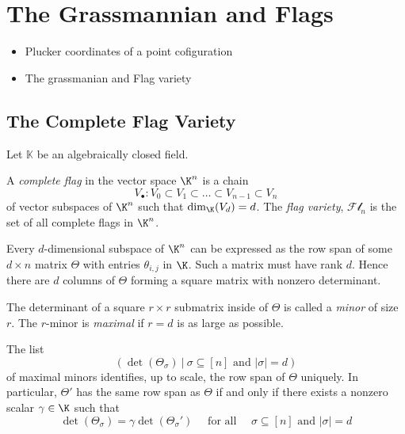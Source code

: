 \section{The Grassmannian and Flags}

\begin{itemize}
    \item Plucker coordinates of a point cofiguration
    \item The grassmanian and Flag variety
\end{itemize}

\subsection{The Complete Flag Variety}

Let $\mathbb{K}$ be an algebraically closed field.

\begin{definition}
    A \textit{complete flag} in the vector space $\K^n$ is a chain
    $$V_{\bullet} : V_{0} \subset V_1 \subset \dots \subset V_{n-1} \subset V_{n} $$
    of vector subspaces of $\K^n$ such that $\text{dim}_{\K}(V_d) = d$.
    The \textit{flag variety}, $\mathcal{Fl}_n$ is the set of all complete flags in $\K^n$.
\end{definition}

Every $d$-dimensional subspace of $\K^n$ can be expressed as the row span of some $d \times n$ matrix $\Theta$ with entries $\theta_{i,j}$ in $\K$.
Such a matrix must have rank $d$.
Hence there are $d$ columns of $\Theta$ forming a square matrix with nonzero determinant.

\begin{definition}[Minor]
    The determinant of a square $r \times r$ submatrix inside of $\Theta$ is called a \textit{minor} of size $r$.
    The $r$-minor is \textit{maximal} if $r = d$ is as large as possible.
\end{definition}

\begin{proposition}
    The list
    $$(\det (\Theta_{\sigma}) \: | \: \sigma \subseteq [n] \text{ and } |\sigma| = d)$$
    of maximal minors identifies, up to scale, the row span of $\Theta$ uniquely.
    In particular, $\Theta'$ has the same row span as $\Theta$ if and only if there exists a nonzero scalar $\gamma \in \K$ such that
    $$\det(\Theta_{\sigma}) = \gamma \det(\Theta_{\sigma}') \quad \text{ for all } \quad \sigma \subseteq [n] \text{ and } |\sigma| = d$$
\end{proposition}

